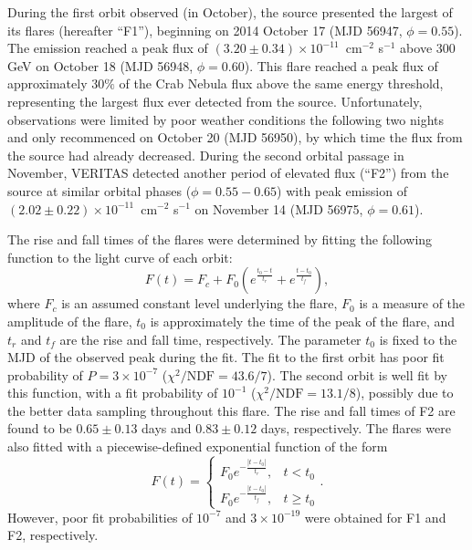 \documentclass[preprint2]{aastex}
\newcommand{\pflux}{~cm$^{-2}$ s$^{-1}$}
\newcommand{\gev}{\,GeV}
\begin{document}
During the first orbit observed (in October), the source presented the largest of its flares (hereafter ``F1''), beginning on 2014 October 17 (MJD 56947, $\phi = 0.55$). The emission reached a peak flux of $(3.20 \pm 0.34) \times10^{-11}$\pflux{} above 300\gev{} on October 18 (MJD 56948, $\phi=0.60$). This flare reached a peak flux of approximately $30\%$ of the Crab Nebula flux above the same energy threshold, representing the largest flux ever detected from the source. Unfortunately, observations were limited by poor weather conditions the following two nights and only recommenced on October 20 (MJD 56950), by which time the flux from the source had already decreased. During the second orbital passage in November, VERITAS detected another period of elevated flux (``F2'') from the source at similar orbital phases ($\phi = 0.55-0.65$) with peak emission of $(2.02 \pm 0.22) \times10^{-11}$\pflux{} on November 14 (MJD 56975, $\phi=0.61$).

The rise and fall times of the flares were determined by fitting the following function \citep[Equation 7]{2010ApJ...722..520A} to the light curve of each orbit:
\begin{equation}
F(t)=F_c + F_0 \left( e^{\frac{t_0 - t}{t_r}} + e^{\frac{t-t_0}{t_f}} \right),
\end{equation}
where $F_c$ is an assumed constant level underlying the flare, $F_0$ is a measure of the amplitude of the flare, $t_0$ is approximately the time of the peak of the flare, and $t_r$ and $t_f$ are the rise and fall time, respectively. The parameter $t_0$ is fixed to the MJD of the observed peak during the fit. The fit to the first orbit has poor fit probability of $P = 3 \times 10^{-7}$ ($\chi^2/\mbox{NDF} = 43.6/7$). %
The second orbit is well fit by this function, with a fit probability of $10^{-1}$ ($\chi^2/\mbox{NDF} = 13.1/8$), possibly due to the better data sampling throughout this flare. The rise and fall times of F2 are found to be $0.65 \pm 0.13$ days and $0.83 \pm 0.12$ days, respectively. The flares were also fitted with a piecewise-defined exponential function of the form
\begin{equation}
F(t)=
\begin{cases}
F_0 e^{-\frac{|t-t_0|}{t_r}}, & t< t_0 \\
F_0 e^{-\frac{|t-t_0|}{t_f}}, & t\geq t_0
\end{cases}
.
\end{equation}
 However, poor fit probabilities of $10^{-7}$ and $3 \times 10^{-19}$ were obtained for F1 and F2, respectively. %
\end{document}
